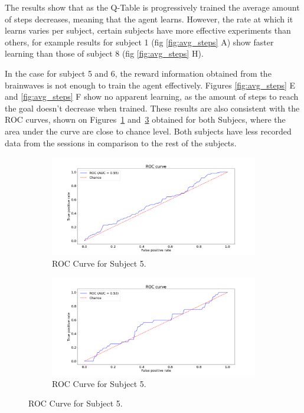 \documentclass[journal]{IEEEtran}
\begin{document}
{{The results show that as the Q-Table is progressively trained the average amount of steps decreases, meaning that the agent learns. However, the rate at which it learns varies per subject, certain subjects have more effective experiments than others, for example results for subject 1 (fig \ref{fig:avg_steps} A) show faster learning than those of subject 8 (fig \ref{fig:avg_steps} H).

In the case for subject 5 and 6, the reward information obtained from the brainwaves is not enough to train the agent effectively. Figures \ref{fig:avg_steps} E and \ref{fig:avg_steps} F show no apparent learning, as the amount of steps to reach the goal doesn't decrease when trained.  These results are also consistent with the ROC curves, shown on Figures~\ref{fig:subject5roc} and~\ref{fig:subject6roc} obtained for both Subjecs, where the area under the curve are close to chance level.  Both subjects have less recorded data from the sessions in comparison to the rest of the subjects. 

\begin{figure}[h!]
\begin{subfigure}{0.25\textwidth}
    \centering
    \includegraphics[scale=0.2]{Images/Classification_test/roc_manuel.png}
    \caption{ROC Curve for Subject 5.}
    \label{fig:subject5roc}
\end{subfigure}
\begin{subfigure}{0.25\textwidth}
    \centering
    \includegraphics[scale=0.2]{Images/Classification_test/roc_marta.png}
    \caption{ROC Curve for Subject 5.}
    \label{fig:subject6roc}
\end{subfigure}
\end{figure}

}}
\end{document}
